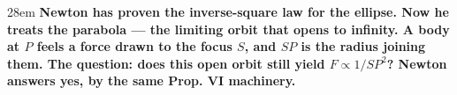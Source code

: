 \documentclass[border=4pt]{standalone}
\begin{document}
\begin{varwidth}{28em}
\large\bfseries
Newton has proven the inverse-square law for the \textcolor{parabblue}{ellipse}. Now he treats      the \textcolor{parabblue}{parabola} — the limiting orbit that opens to infinity. A body at $P$      feels a force drawn to the \textcolor{fociorange}{focus $S$}, and \textcolor{radgreen}{$SP$} is the radius      joining them. The question: does this open orbit still yield $F \propto 1/SP^2$?      Newton answers yes, by the same Prop. VI machinery.
\end{varwidth}
\end{document}
